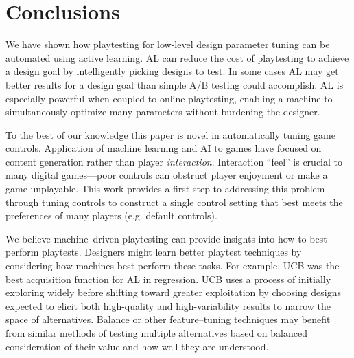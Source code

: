 \documentclass{sig-alternate}
\begin{document}

\section{Conclusions}





We have shown how playtesting for low-level design parameter tuning can be automated using active learning.
AL can reduce the cost of playtesting to achieve a design goal by intelligently picking designs to test.
In some cases AL may get better results for a design goal than simple A/B testing could accomplish.
AL is especially powerful when coupled to online playtesting, enabling a machine to simultaneously optimize many parameters without burdening the designer.

To the best of our knowledge this paper is novel in automatically tuning game controls. %
Application of machine learning and AI to games have focused on content generation rather than player \textit{interaction}.
Interaction ``feel'' is crucial to many digital games---poor controls can obstruct player enjoyment or make a game unplayable.
This work provides a first step to addressing this problem through tuning controls to construct a single control setting that best meets the preferences of many players (e.g. default controls).

We believe machine--driven playtesting can provide insights into how to best perform playtests.
Designers might learn better playtest techniques by considering how machines best perform these tasks.
For example, UCB was the best acquisition function for AL in regression.
UCB uses a process of initially exploring widely before shifting toward greater exploitation by choosing designs expected to elicit both high-quality and high-variability results to narrow the space of alternatives.
Balance or other feature--tuning techniques may benefit from similar methods of testing multiple alternatives based on balanced consideration of their value and how well they are understood.
\end{document}
